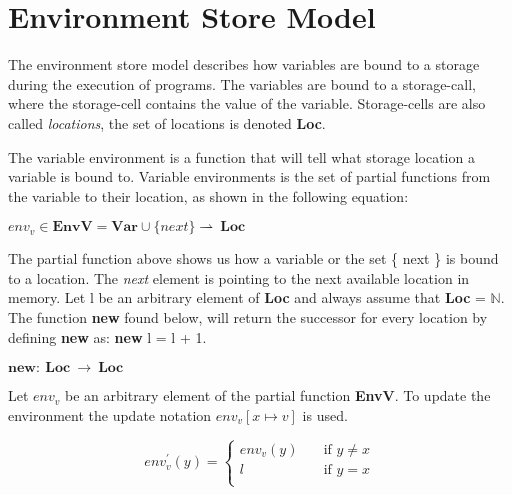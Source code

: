   
  \section{Environment Store Model}
  The environment store model describes how variables are bound to a storage during the execution of programs. The variables are bound to a storage-call, where the storage-cell contains the value of the variable. Storage-cells are also called \textit{locations}, the set of locations is denoted \textbf{Loc}.
  
  The variable environment is a function that will tell what storage location a variable is bound to. Variable environments  is the set of partial functions  from the variable to their location, as shown in the following equation:
  
  \begin{math}  
	 env_v \in \boldsymbol{EnvV} = \boldsymbol{Var} \cup \{ next \} \rightharpoonup \ \boldsymbol{Loc}
  \end{math}
  
  The partial function above shows us how a variable or the set \{ next \} is bound to a location. The \textit{next} element is pointing to the next available location in memory.
  Let l be an arbitrary element of \textbf{Loc} and always assume that \textbf{Loc} = \begin{math} \mathbb{N}. \end{math} The function \textbf{new} found below, will return the successor for every location by defining \textbf{new} as: \textbf{new} l = l + 1.
  
  \begin{math}
	  \boldsymbol{new} : \ \boldsymbol{Loc} \ \rightarrow \ \boldsymbol{Loc}
  \end{math}
  
  Let \begin{math}env_v\end{math} be an arbitrary element of the partial function \textbf{EnvV}. To update the environment the update notation \begin{math}env_v [x \mapsto v] \end{math} is used. 
  
  \[ env^{'}_v(y) =
      \begin{cases}
        env_v(y)       & \quad \text{if } y \not= x\\
        l  & \quad \text{if } y = x\\
      \end{cases}
    \]
      
